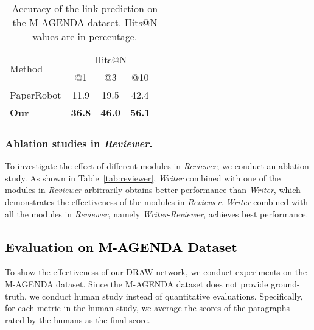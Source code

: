 \documentclass[letterpaper]{article}
\def\wzq{\textcolor{black}}
\begin{document}
\begin{table}[t]
	\centering

	\begin{tabular}{l|cccc}
	\hline
		\multirow{2}[0]{*}{Method} &
		 \multicolumn{3}{c}{Hits@N} \\
		 \cline{2-5}
	     & @1 & @3 & @10 &   \\
	 \hline
	    PaperRobot   &11.9  &19.5  &42.4    \\
		\textbf{Our}   &\textbf{36.8}  & \textbf{46.0}   & \textbf{56.1} 
		 \\
     \hline
	\end{tabular}
	
	\caption{Accuracy of the link prediction on the M-AGENDA dataset. Hits@N values are in percentage.}
	
	\label{tab:automatic_metric}
	
\end{table}
\subsubsection{Ablation studies in \textit{Reviewer}.}
To investigate the effect of different modules in 
\textit{Reviewer}, we conduct an ablation study.
As shown in Table~\ref{tab:reviewer},
\textit{Writer} combined with one of the modules in \textit{Reviewer} arbitrarily obtains better performance than \textit{Writer}, which demonstrates the effectiveness of the modules in \textit{Reviewer}.  \textit{Writer} combined with all the modules in \textit{Reviewer}, namely \textit{Writer}-\textit{Reviewer}, achieves best performance.




\subsection{Evaluation \wzq{on M-AGENDA Dataset}}

To show the effectiveness of our DRAW network, we conduct experiments on the M-AGENDA dataset. Since the M-AGENDA dataset does not provide ground-truth, we conduct human study instead of quantitative evaluations. Specifically, for each metric in the human study, we average the scores of the paragraphs rated by the humans as the final score.
\end{document}
